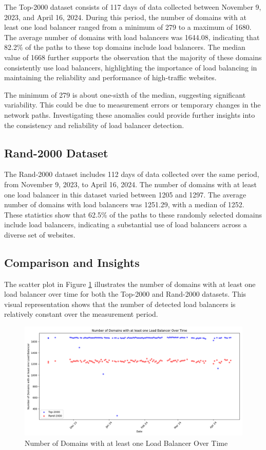 \documentclass[12pt]{cwru_thesis}
\begin{document}
The Top-2000 dataset consists of 117 days of data collected between November 9, 2023, and April 16, 2024. During this period, the number of domains with at least one load balancer ranged from a minimum of 279 to a maximum of 1680. The average number of domains with load balancers was 1644.08, indicating that 82.2\% of the paths to these top domains include load balancers. The median value of 1668 further supports the observation that the majority of these domains consistently use load balancers, highlighting the importance of load balancing in maintaining the reliability and performance of high-traffic websites.

The minimum of 279 is about one-sixth of the median, suggesting significant variability. This could be due to measurement errors or temporary changes in the network paths. Investigating these anomalies could provide further insights into the consistency and reliability of load balancer detection.

\subsection{Rand-2000 Dataset}

The Rand-2000 dataset includes 112 days of data collected over the same period, from November 9, 2023, to April 16, 2024. The number of domains with at least one load balancer in this dataset varied between 1205 and 1297. The average number of domains with load balancers was 1251.29, with a median of 1252. These statistics show that 62.5\% of the paths to these randomly selected domains include load balancers, indicating a substantial use of load balancers across a diverse set of websites.

\subsection{Comparison and Insights}

The scatter plot in Figure \ref{fig:scatter_plot_domains} illustrates the number of domains with at least one load balancer over time for both the Top-2000 and Rand-2000 datasets. This visual representation shows that the number of detected load balancers is relatively constant over the measurement period.

\begin{figure}[h]
    \centering
    \includegraphics[width=\textwidth]{figures/scatter_plot_domains.png}
    \caption{Number of Domains with at least one Load Balancer Over Time}
    \label{fig:scatter_plot_domains}
\end{figure}
\end{document}
